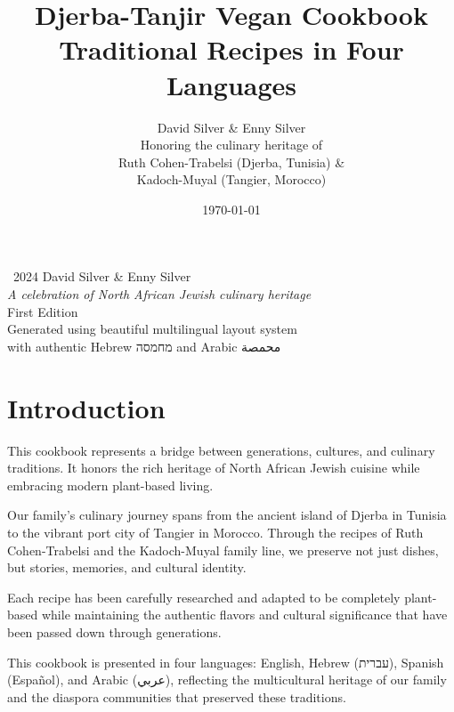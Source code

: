 \documentclass{cookbook}
\title{Djerba-Tanjir Vegan Cookbook\\
       \large Traditional Recipes in Four Languages}
\author{David Silver \& Enny Silver\\
        \small Honoring the culinary heritage of\\
        \small Ruth Cohen-Trabelsi (Djerba, Tunisia) \&\\
        \small Kadoch-Muyal (Tangier, Morocco)}
\date{\today}
\begin{document}
\frontmatter

\maketitle
\thispagestyle{empty}

\clearpage
\thispagestyle{empty}
\vspace*{\fill}
\begin{center}
\textcopyright\ 2024 David Silver \& Enny Silver\\[1em]
\textit{A celebration of North African Jewish culinary heritage}\\[2em]
First Edition\\[1em]
Generated using beautiful multilingual layout system\\
with authentic Hebrew מחמסה and Arabic محمصة
\end{center}
\vspace*{\fill}

\clearpage
\tableofcontents

\chapter*{Introduction}

This cookbook represents a bridge between generations, cultures, and culinary traditions. It honors the rich heritage of North African Jewish cuisine while embracing modern plant-based living.

Our family's culinary journey spans from the ancient island of Djerba in Tunisia to the vibrant port city of Tangier in Morocco. Through the recipes of Ruth Cohen-Trabelsi and the Kadoch-Muyal family line, we preserve not just dishes, but stories, memories, and cultural identity.

Each recipe has been carefully researched and adapted to be completely plant-based while maintaining the authentic flavors and cultural significance that have been passed down through generations.

This cookbook is presented in four languages: English, Hebrew (עברית), Spanish (Español), and Arabic (عربي), reflecting the multicultural heritage of our family and the diaspora communities that preserved these traditions.

\mainmatter


% 

\backmatter
\end{document}
